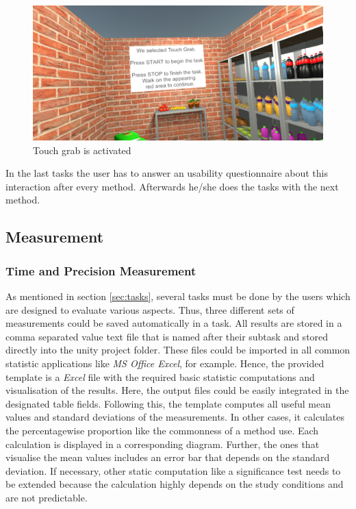 \begin{figure}[H] 
	\center 
	\includegraphics[width=12cm]{Images/TaskWall_2.PNG}
	\caption[Touch grab is activated]{Touch grab is activated}
	\label{fig:taskW2}
\end{figure}

In the last tasks the user has to answer an usability questionnaire about this interaction after every method. Afterwards he/she does the tasks with the next method. \\

\subsection{Measurement} \label{sec:measurement}

\subsubsection{Time and Precision Measurement}
As mentioned in section \ref{sec:tasks}, several tasks must be done by the users which are designed to evaluate various aspects. Thus, three different sets of measurements could be saved automatically in a task. All results are stored in a comma separated value text file that is named after their subtask and stored directly into the unity project folder. These files could be imported in all common statistic applications like \textit{MS Office Excel}, for example. Hence, the provided template is a \textit{Excel} file with the required basic statistic computations and visualisation of the results. Here, the output files could be easily integrated in the designated table fields. Following this, the template computes all useful mean values and standard deviations of the measurements. In other cases, it calculates the percentagewise proportion like the commonness of a method use. Each calculation is displayed in a corresponding diagram. Further, the ones that visualise the mean values includes an error bar that depends on the standard deviation. If necessary, other static computation like a significance test needs to be extended because the calculation highly depends on the study conditions and are not predictable.

